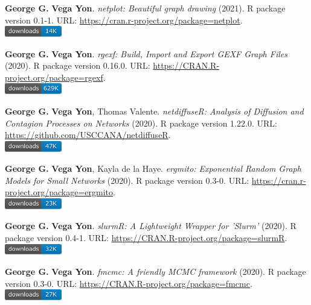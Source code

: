 \item \textbf{George G.} \textbf{Vega Yon}. \textit{netplot: Beautiful graph drawing} (2021). R package version 0.1-1. {\small URL}: \url{https://cran.r-project.org/package=netplot}. \\\includegraphics[width=2.5cm]{fig/cran-downloads-netplot.pdf} 
\item \textbf{George G.} \textbf{Vega Yon}. \textit{rgexf: Build, Import and Export GEXF Graph Files} (2020). R package version 0.16.0. {\small URL}: \url{https://CRAN.R-project.org/package=rgexf}. \\\includegraphics[width=2.5cm]{fig/cran-downloads-rgexf.pdf} 
\item \textbf{George G.} \textbf{Vega Yon}, Thomas Valente. \textit{{{netdiffuseR: Analysis of Diffusion and Contagion Processes on Networks}}} (2020). R package version 1.22.0. {\small URL}: \url{https://github.com/USCCANA/netdiffuseR}. \\\includegraphics[width=2.5cm]{fig/cran-downloads-netdiffuser.pdf} 
\item \textbf{George G.} \textbf{Vega Yon}, Kayla de la Haye. \textit{ergmito: Exponential Random Graph Models for Small Networks} (2020). R package version 0.3-0. {\small URL}: \url{https://cran.r-project.org/package=ergmito}. \\\includegraphics[width=2.5cm]{fig/cran-downloads-ergmito.pdf} 
\item \textbf{George G.} \textbf{Vega Yon}. \textit{slurmR: A Lightweight Wrapper for 'Slurm'} (2020). R package version 0.4-1. {\small URL}: \url{https://CRAN.R-project.org/package=slurmR}. \\\includegraphics[width=2.5cm]{fig/cran-downloads-slurmr.pdf} 
\item \textbf{George G.} \textbf{Vega Yon}. \textit{fmcmc: A friendly MCMC framework} (2020). R package version 0.3-0. {\small URL}: \url{https://CRAN.R-project.org/package=fmcmc}. \\\includegraphics[width=2.5cm]{fig/cran-downloads-fmcmc.pdf} 

